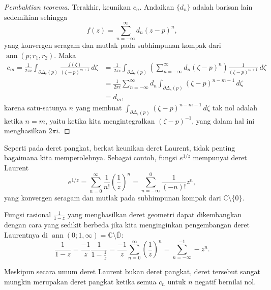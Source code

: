 \documentclass[12pt,openany]{book}
\newcommand{\ann}{\operatorname{ann}}
\newcommand{\C}{{\mathbb{C}}}
\newcommand{\D}{{\mathbb{D}}}
\theoremstyle{plain}
\theoremstyle{remark}
\theoremstyle{definition}
\theoremstyle{exercise}
\theoremstyle{example}
\begin{document}
\begin{proof}[Pembuktian teorema]
Terakhir, keunikan $c_n$. Andaikan $\{ d_n \}$ adalah barisan lain sedemikian
sehingga
\begin{equation*}
f(z)
=
\sum_{n=-\infty}^{\infty} d_n {(z-p)}^{n} ,
\end{equation*}
yang konvergen seragam dan mutlak pada subhimpunan kompak dari $\ann(p;r_1,r_2)$.
Maka
\begin{equation*}
\begin{split}
c_m = \frac{1}{2\pi i}
\int_{\partial \Delta_{s}(p)} \frac{f(\zeta)}{{(\zeta-p)}^{m+1}}
 \, d\zeta 
& =
\frac{1}{2\pi i}
\int_{\partial \Delta_{s}(p)}
\left(\sum_{n=-\infty}^{\infty} d_n {(\zeta-p)}^{n} \right)
\frac{1}{{(\zeta-p)}^{m+1}}
 \, d\zeta 
\\
& =
\frac{1}{2\pi i}
\sum_{n=-\infty}^{\infty}
d_n
\int_{\partial \Delta_{s}(p)}
{(\zeta-p)}^{n-m-1}
 \, d\zeta 
\\
& =
d_m ,
\end{split}
\end{equation*}
karena satu-satunya $n$ yang membuat
$\int_{\partial \Delta_{s}(p)}
{(\zeta-p)}^{n-m-1}
 \, d\zeta$ tak nol adalah ketika $n=m$, yaitu ketika kita mengintegralkan
${(\zeta-p)}^{-1}$, yang dalam hal ini menghasilkan $2 \pi i$.
\end{proof}

Seperti pada deret pangkat, berkat keunikan deret Laurent,
tidak penting bagaimana kita memperolehnya. Sebagai contoh, fungsi $e^{1/z}$
mempunyai deret Laurent
\begin{equation*}
e^{1/z}
=
\sum_{n=0}^{\infty} \frac{1}{n!} {\left(\frac{1}{z}\right)}^n
=
\sum_{n=-\infty}^0 \frac{1}{(-n)!} z^n ,
\end{equation*}
yang konvergen seragam dan mutlak pada subhimpunan kompak dari
$\C \setminus \{ 0 \}$.

Fungsi rasional $\frac{1}{1-z}$ yang menghasilkan deret geometri dapat
dikembangkan dengan cara yang sedikit berbeda jika kita menginginkan pengembangan deret Laurentnya
di $\ann(0;1,\infty) = \C \setminus \overline{\D}$:
\begin{equation*}
\frac{1}{1-z}
=
\frac{-1}{z}
\frac{1}{1-\frac{1}{z}}
=
\frac{-1}{z}
\sum_{n=0}^\infty
{\left(\frac{1}{z}\right)}^n
=
\sum_{n=-\infty}^{-1}
- z^{n} .
\end{equation*}

Meskipun secara umum deret Laurent bukan deret pangkat,
deret tersebut sangat mungkin merupakan deret pangkat ketika semua $c_n$ untuk $n$ negatif bernilai nol.

\medskip
\end{document}
